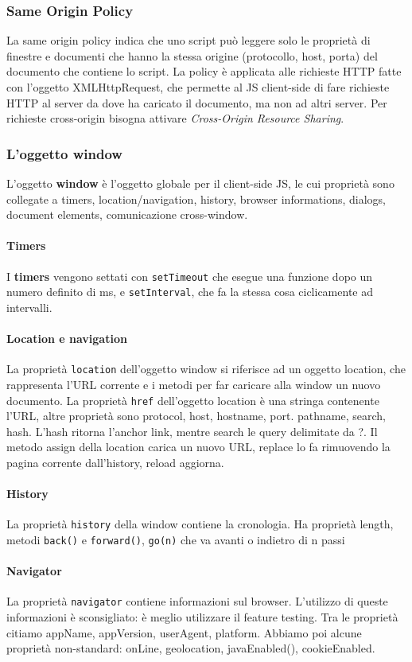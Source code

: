 \documentclass[11pt]{article}
\newcommand{\code}[1]{\texttt{#1}}
\begin{document}
\subsubsection{Same Origin Policy}
La same origin policy indica che uno script può leggere solo le proprietà di finestre e documenti che hanno la stessa origine (protocollo, host, porta) del documento che contiene lo script. La policy è applicata alle richieste HTTP fatte con l'oggetto XMLHttpRequest, che permette al JS client-side di fare richieste HTTP al server da dove ha caricato il documento, ma non ad altri server. Per richieste cross-origin bisogna attivare \textit{Cross-Origin Resource Sharing}. 
\subsubsection{L'oggetto window}
L'oggetto \textbf{window} è l'oggetto globale per il client-side JS, le cui proprietà sono collegate a timers, location/navigation, history, browser informations, dialogs, document elements, comunicazione cross-window. 
\paragraph{Timers} I \textbf{timers} vengono settati con \code{setTimeout} che esegue una funzione dopo un numero definito di ms, e \code{setInterval}, che fa la stessa cosa ciclicamente ad intervalli.
\paragraph{Location e navigation} La proprietà \code{location} dell'oggetto window si riferisce ad un oggetto location, che rappresenta l'URL corrente e i metodi per far caricare alla window un nuovo documento. La proprietà \code{href} dell'oggetto location è una stringa contenente l'URL, altre proprietà sono protocol, host, hostname, port. pathname, search, hash. L'hash ritorna l'anchor link, mentre search le query delimitate da ?. Il metodo assign della location carica un nuovo URL, replace lo fa rimuovendo la pagina corrente dall'history, reload aggiorna. 
\paragraph{History} La proprietà \code{history} della window contiene la cronologia. Ha proprietà length, metodi \code{back()} e \code{forward()}, \code{go(n)} che va avanti o indietro di n passi
\paragraph{Navigator} La proprietà \code{navigator} contiene informazioni sul browser. L'utilizzo di queste informazioni è sconsigliato: è meglio utilizzare il feature testing. Tra le proprietà citiamo appName, appVersion, userAgent, platform. Abbiamo poi alcune proprietà non-standard: onLine, geolocation, javaEnabled(), cookieEnabled.
\end{document}
